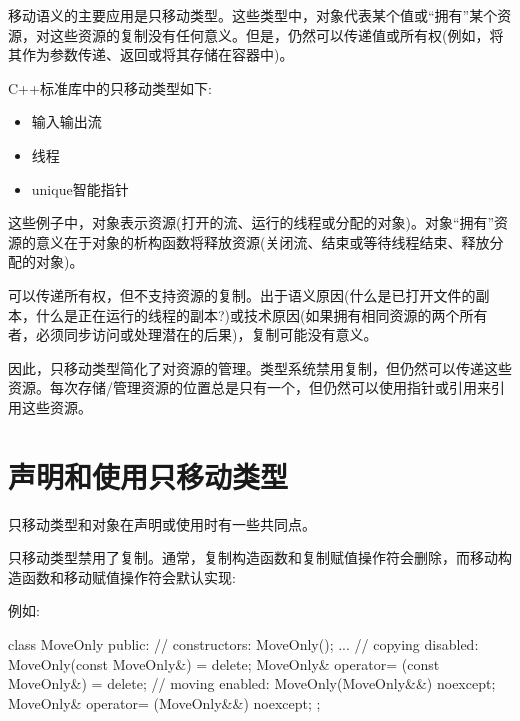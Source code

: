 
移动语义的主要应用是只移动类型。这些类型中，对象代表某个值或“拥有”某个资源，对这些资源的复制没有任何意义。但是，仍然可以传递值或所有权(例如，将其作为参数传递、返回或将其存储在容器中)。\par

C++标准库中的只移动类型如下:\par

\begin{itemize}
  \item 输入输出流
  \item 线程
  \item unique智能指针
\end{itemize}

这些例子中，对象表示资源(打开的流、运行的线程或分配的对象)。对象“拥有”资源的意义在于对象的析构函数将释放资源(关闭流、结束或等待线程结束、释放分配的对象)。\par

可以传递所有权，但不支持资源的复制。出于语义原因(什么是已打开文件的副本，什么是正在运行的线程的副本?)或技术原因(如果拥有相同资源的两个所有者，必须同步访问或处理潜在的后果)，复制可能没有意义。\par

因此，只移动类型简化了对资源的管理。类型系统禁用复制，但仍然可以传递这些资源。每次存储/管理资源的位置总是只有一个，但仍然可以使用指针或引用来引用这些资源。\par


\section{声明和使用只移动类型}

只移动类型和对象在声明或使用时有一些共同点。\par


只移动类型禁用了复制。通常，复制构造函数和复制赋值操作符会删除，而移动构造函数和移动赋值操作符会默认实现:\par

例如:\par

\begin{codebox}[cpp]
class MoveOnly {
public:
  // constructors:
  MoveOnly();
  ...
  // copying disabled:
  MoveOnly(const MoveOnly&) = delete;
  MoveOnly& operator= (const MoveOnly&) = delete;
  // moving enabled:
  MoveOnly(MoveOnly&&) noexcept;
  MoveOnly& operator= (MoveOnly&&) noexcept;
};
\end{codebox}

